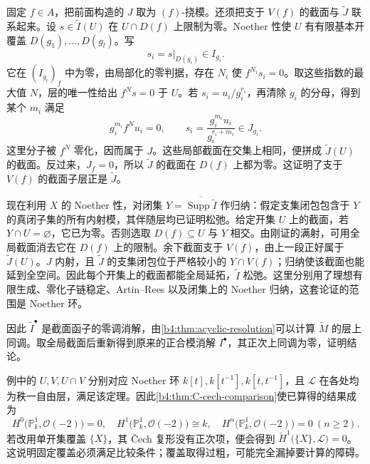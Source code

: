 \begin{proofsketch}
	固定 \(f\in A\)，把前面构造的 \(J\) 取为 \((f)\)-挠模。还须把支于 \(V(f)\) 的截面与 \(\widetilde J\) 联系起来。设 \(s\in\widetilde I(U)\) 在 \(U\cap D(f)\) 上限制为零。Noether 性使 \(U\) 有有限基本开覆盖 \(D(g_1),\ldots,D(g_l)\)。写
	\[
		s_i=s|_{D(g_i)}\in I_{g_i}.
	\]
	它在 \((I_{g_i})_f\) 中为零，由局部化的零判据，存在 \(N_i\) 使 \(f^{N_i}s_i=0\)。取这些指数的最大值 \(N\)，层的唯一性给出 \(f^Ns=0\) 于 \(U\)。若 \(s_i=u_i/g_i^{r_i}\)，再清除 \(g_i\) 的分母，得到某个 \(m_i\) 满足
	\[
		g_i^{m_i}f^Nu_i=0, \qquad s_i=\frac{g_i^{m_i}u_i}{g_i^{r_i+m_i}}\in J_{g_i}.
	\]
	这里分子被 \(f^N\) 零化，因而属于 \(J\)。这些局部截面在交集上相同，便拼成 \(\widetilde J(U)\) 的截面。反过来，\(J_f=0\)，所以 \(\widetilde J\) 的截面在 \(D(f)\) 上都为零。这证明了支于 \(V(f)\) 的截面子层正是 \(\widetilde J\)。

	现在利用 \(X\) 的 Noether 性，对闭集 \(Y=\overline{\operatorname{Supp}\widetilde I}\) 作归纳：假定支集闭包包含于 \(Y\) 的真闭子集的所有内射模，其伴随层均已证明松弛。给定开集 \(U\) 上的截面，若 \(Y\cap U=\varnothing\)，它已为零。否则选取 \(D(f)\subseteq U\) 与 \(Y\) 相交。由刚证的满射，可用全局截面消去它在 \(D(f)\) 上的限制。余下截面支于 \(V(f)\)，由上一段正好属于 \(\widetilde J(U)\)。\(J\) 内射，且 \(\widetilde J\) 的支集闭包位于严格较小的 \(Y\cap V(f)\)；归纳使该截面也能延到全空间。因此每个开集上的截面都能全局延拓，\(\widetilde I\) 松弛。这里分别用了理想有限生成、零化子链稳定、Artin--Rees 以及闭集上的 Noether 归纳，这套论证的范围是 Noether 环。

	因此 \(\widetilde I^\bullet\) 是截面函子的零调消解，由\cref{b4:thm:acyclic-resolution}可以计算 \(\widetilde M\) 的层上同调。取全局截面后重新得到原来的正合模消解 \(I^\bullet\)，其正次上同调为零，证明结论。
\end{proofsketch}

例中的 \(U,V,U\cap V\) 分别对应 Noether 环 \(k[t],k[t^{-1}],k[t,t^{-1}]\)，且 \(\mathcal L\) 在各处均为秩一自由层，满足该定理。因此\cref{b4:thm:C-cech-comparison}使已算得的结果成为
\[
	H^0\bigl(\mathbb P^1_k,\mathcal O(-2)\bigr)=0, \quad H^1\bigl(\mathbb P^1_k,\mathcal O(-2)\bigr)\cong k, \quad H^n\bigl(\mathbb P^1_k,\mathcal O(-2)\bigr)=0\ (n\ge2).
\]
若改用单开集覆盖 \(\{X\}\)，其 Čech 复形没有正次项，便会得到 \(\check H^1\bigl(\{X\},\mathcal L\bigr)=0\)。这说明固定覆盖必须满足比较条件；覆盖取得过粗，可能完全漏掉要计算的障碍。

